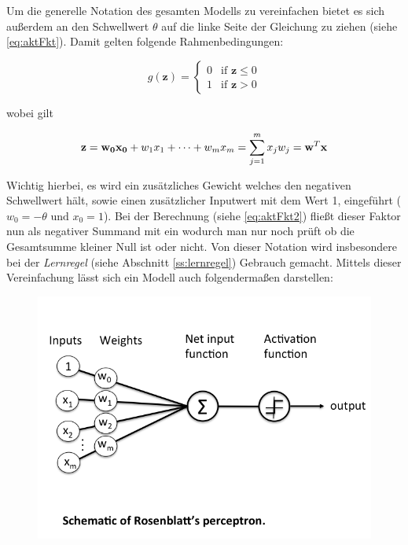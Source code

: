 Um die generelle Notation des gesamten Modells zu vereinfachen bietet es sich außerdem an den Schwellwert $\theta$ auf die linke Seite der Gleichung zu ziehen (siehe \ref{eq:aktFkt}). Damit gelten folgende Rahmenbedingungen: 

\begin{equation} \label{eq:aktFkt2}
g(\mathbf{z}) =\begin{cases}
	0 & \mbox{if } \mathbf{z} \leq 0 \\
    1 & \mbox{if } \mathbf{z} > 0
  \end{cases}
\end{equation}

wobei gilt

\begin{equation}
\mathbf{z} =  \mathbf{w_0x_{0}} + w_1x_{1} + \dots + w_mx_{m} = \sum_{j=1}^{m} x_{j}w_{j} \\ = \mathbf{w}^T\mathbf{x}
\end{equation}

\label{w0Erklaerung}
Wichtig hierbei, es wird ein zusätzliches Gewicht welches den negativen Schwellwert hält, sowie einen zusätzlicher Inputwert mit dem Wert 1, eingeführt ($w_0 = -\theta  \text{ und } x_0=1$). Bei der Berechnung (siehe \autoref{eq:aktFkt2}) fließt dieser Faktor nun als negativer Summand mit ein wodurch man nur noch prüft ob die Gesamtsumme kleiner Null ist oder nicht. Von dieser Notation wird insbesondere bei der \emph{Lernregel} (siehe Abschnitt \ref{ss:lernregel}) Gebrauch gemacht. Mittels dieser Vereinfachung lässt sich ein Modell auch folgendermaßen darstellen: 

\begin{figure}[!htb]
	\centering
	\includegraphics[width=\linewidth]{img/perceptron_schematisch}
	\label{fig:perc_modelansicht}
\end{figure}

